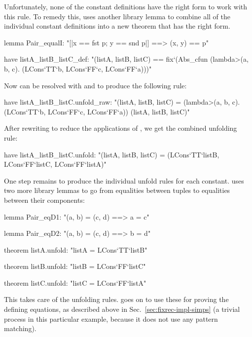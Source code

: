 %
Unfortunately, none of the constant definitions have the right form to work with this rule. To remedy this, {\fixrec} uses another library lemma to combine all of the individual constant definitions into a new theorem that has the right form.
%
\begin{isacode}
lemma Pair_equalI: "[|x == fst p; y == snd p|] ==> (x, y) == p"
\end{isacode}
\unmedskip
{}
\begin{isacode}
have listA_listB_listC_def:
  "(listA, listB, listC) ==
    fix`(Abs_cfun (\<lambda>(a, b, c). (LCons`TT`b, LCons`FF`c, LCons`FF`a)))"
\end{isacode}
%
Now  can be resolved with  and  to produce the following rule:
%
\begin{isacode}
have listA_listB_listC.unfold_raw:
  "(listA, listB, listC) =
    (\<lambda>(a, b, c). (LCons`TT`b, LCons`FF`c, LCons`FF`a)) (listA, listB, listC)"
\end{isacode}
%
After rewriting to reduce the applications of , we get the combined unfolding rule:
%
\begin{isacode}
have listA_listB_listC.unfold:
  "(listA, listB, listC) = (LCons`TT`listB, LCons`FF`listC, LCons`FF`listA)"
\end{isacode}
%
One step remains to produce the individual unfold rules for each constant. {\fixrec} uses two more library lemmas to go from equalities between tuples to equalities between their components:
%
\begin{isacode}
lemma Pair_eqD1: "(a, b) = (c, d) ==> a = c"
\end{isacode}
\unmedskip
{}
\begin{isacode}
lemma Pair_eqD2: "(a, b) = (c, d) ==> b = d"
\end{isacode}
\unmedskip
{}
\begin{isacode}
theorem listA.unfold: "listA = LCons`TT`listB"
\end{isacode}
\unmedskip
{}
\begin{isacode}
theorem listB.unfold: "listB = LCons`FF`listC"
\end{isacode}
\unmedskip
{}
\begin{isacode}
theorem listC.unfold: "listC = LCons`FF`listA"
\end{isacode}
%
This takes care of the unfolding rules. {\fixrec} goes on to use these for proving the defining equations, as described above in Sec.~\ref{sec:fixrec-impl-simps} (a trivial process in this particular example, because it does not use any pattern matching).

